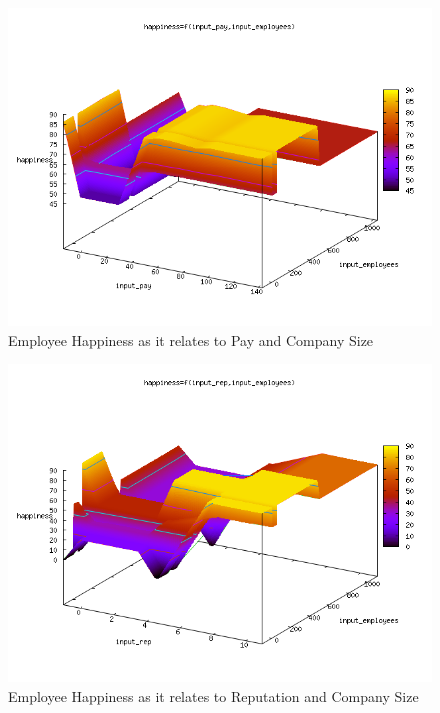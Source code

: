 \documentclass[12pt,fleqn,reqno,letterpaper]{article}
\begin{document}
\begin{figure}[H]
  \centering
  \includegraphics[scale=0.5,natwidth=640,natheight=480]{fig/baseline_input_pay_input_employees_happiness.png}
  \caption{Employee Happiness as it relates to Pay and Company Size}
  \label{fig:PE}
\end{figure}

\begin{figure}[H]
  \centering
  \includegraphics[scale=0.5,natwidth=640,natheight=480]{fig/baseline_input_rep_input_employees_happiness.png}
  \caption{Employee Happiness as it relates to Reputation and Company Size}
  \label{fig:RE}
\end{figure}
\end{document}
